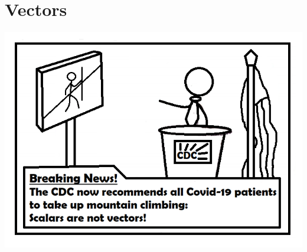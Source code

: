 \chapter{Vectors}\label{chap:vectors}


\centerline{\includegraphics[scale=1]{Chapter2/images/cdc.png}}

\pagebreak  